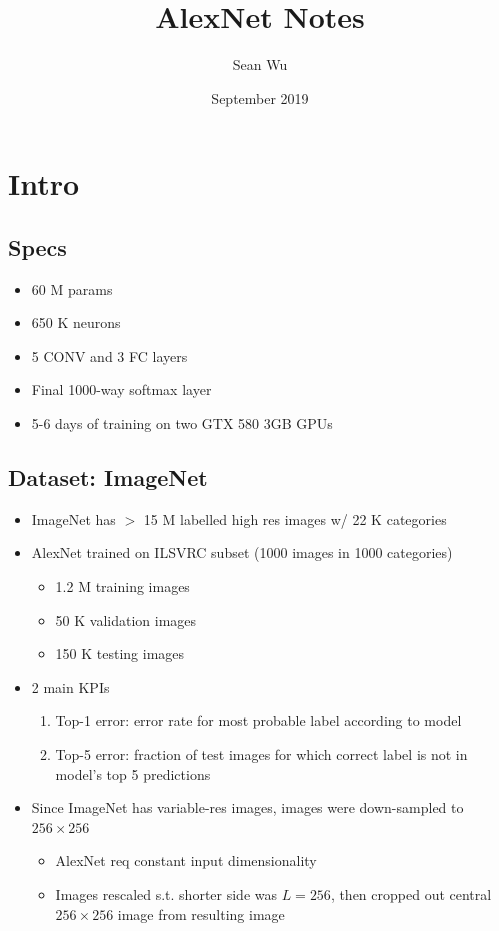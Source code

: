 \documentclass[a4paper,12pt]{article}
\begin{document}
\title{AlexNet Notes}
\author{Sean Wu}
\date{September 2019}
\maketitle

\tableofcontents

\pagebreak

\setlength{\parindent}{0em}
\setlength{\parskip}{1em}

\section{Intro}

\subsection{Specs}
\begin{itemize}
  \item 60 M params
  \item 650 K neurons
  \item 5 CONV and 3 FC layers
  \item Final 1000-way softmax layer
  \item 5-6 days of training on two GTX 580 3GB GPUs
\end{itemize}

\subsection{Dataset: ImageNet}
\begin{itemize}
  \item ImageNet has $>$ 15 M labelled high res images w/ 22 K categories
  \item AlexNet trained on ILSVRC subset (1000 images in 1000 categories)
  \begin{itemize}
    \item 1.2 M training images
    \item 50 K validation images
    \item 150 K testing images
  \end{itemize}
  \item 2 main KPIs
  \begin{enumerate}
    \item Top-1 error: error rate for most probable label according to model
    \item Top-5 error: fraction of test images for which correct label is not in model's top 5 predictions
  \end{enumerate}
  \item Since ImageNet has variable-res images, images were down-sampled to $256\times 256$
  \begin{itemize}
    \item AlexNet req constant input dimensionality
    \item Images rescaled s.t. shorter side was $L = 256$, then cropped out central $256\times 256$ image from resulting image
  \end{itemize}
\end{itemize}
\end{document}
